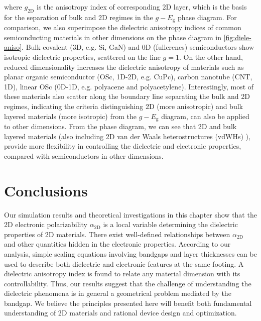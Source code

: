 where $g_{\mathrm{2D}}$ is the anisotropy index of corresponding 2D
layer, which is the basis for the separation of bulk and 2D regimes in
the $g-E_{\mathrm{g}}$ phase diagram.  For comparison, we also
superimpose the dielectric anisotropy indices of common semiconducting
materials in other dimensions on the phase diagram in
\autoref{fig:diele-aniso}. Bulk covalent (3D, e.g. Si, GaN) and 0D
(fullerenes) semiconductors show isotropic dielectric properties,
scattered on the line $g=1$. On the other hand, reduced dimensionality
increases the dielectric anisotropy of materials such as planar
organic semiconductor (OSc, 1D-2D, e.g. CuPc), carbon nanotube (CNT,
1D), linear OSc (0D-1D, e.g. polyacene and
polyacetylene). Interestingly, most of these materials also scatter
along the boundary line separating the bulk and 2D regimes, indicating
the criteria distinguishing 2D (more anisotropic) and bulk layered
materials (more isotropic) from the $g-E_{\mathrm{g}}$ diagram, can
also be applied to other dimensions. From the phase diagram, we can
see that 2D and bulk layered materials (also including 2D van der
Waals heterostructures (vdWHs) \autocite{Novoselov_2016_vdW}), provide more
flexibility in controlling the dielectric and electronic properties,
compared with semiconductors in other dimensions.

%


\section{Conclusions}

Our simulation results and theoretical investigations in this chapter
show that the 2D electronic polarizability $\alpha_{\mathrm{2D}}$ is a
local variable determining the dielectric properties of 2D materials.
There exist well-defined relationships between $\alpha_{\mathrm{2D}}$
and other quantities hidden in the electronic properties.  According
to our analysis, simple scaling equations involving bandgaps and layer
thicknesses can be used to describe both dielectric and electronic
features at the same footing. A dielectric anisotropy index is found
to relate any material dimension with its controllability.  Thus, our
results suggest that the challenge of understanding the dielectric
phenomena is in general a geometrical problem mediated by the
bandgap. We believe the principles presented here will benefit both
fundamental understanding of 2D materials and rational device
design and optimization.





